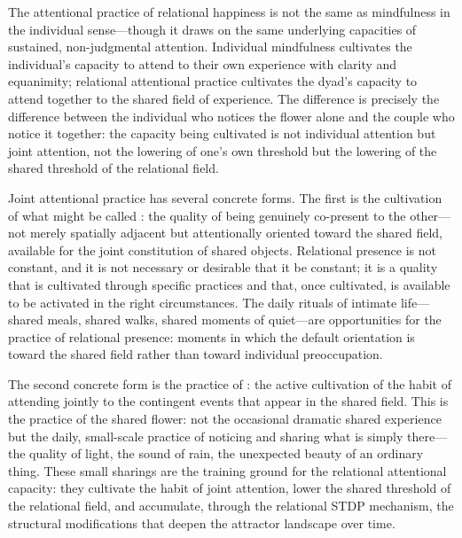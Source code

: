 The attentional practice of relational happiness is not the same as mindfulness in the individual sense---though it draws on the same underlying capacities of sustained, non-judgmental attention. Individual mindfulness cultivates the individual's capacity to attend to their own experience with clarity and equanimity; relational attentional practice cultivates the dyad's capacity to attend together to the shared field of experience. The difference is precisely the difference between the individual who notices the flower alone and the couple who notice it together: the capacity being cultivated is not individual attention but joint attention, not the lowering of one's own threshold but the lowering of the shared threshold of the relational field.

Joint attentional practice has several concrete forms. The first is the cultivation of what might be called : the quality of being genuinely co-present to the other---not merely spatially adjacent but attentionally oriented toward the shared field, available for the joint constitution of shared objects. Relational presence is not constant, and it is not necessary or desirable that it be constant; it is a quality that is cultivated through specific practices and that, once cultivated, is available to be activated in the right circumstances. The daily rituals of intimate life---shared meals, shared walks, shared moments of quiet---are opportunities for the practice of relational presence: moments in which the default orientation is toward the shared field rather than toward individual preoccupation.

The second concrete form is the practice of : the active cultivation of the habit of attending jointly to the contingent events that appear in the shared field. This is the practice of the shared flower: not the occasional dramatic shared experience but the daily, small-scale practice of noticing and sharing what is simply there---the quality of light, the sound of rain, the unexpected beauty of an ordinary thing. These small sharings are the training ground for the relational attentional capacity: they cultivate the habit of joint attention, lower the shared threshold of the relational field, and accumulate, through the relational STDP mechanism, the structural modifications that deepen the attractor landscape over time.


